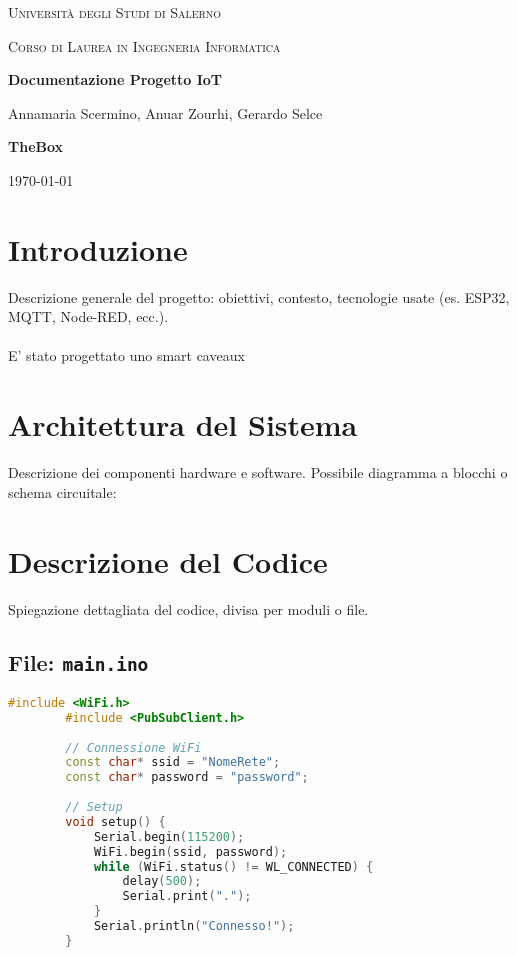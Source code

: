 \documentclass[12pt,a4paper]{article}
\begin{document}
	
	\begin{titlepage}
		\centering
		{\scshape\LARGE Università degli Studi di Salerno \par}
		\vspace{1cm}
		{\scshape\Large Corso di Laurea in Ingegneria Informatica\par}
		\vspace{2cm}
		{\huge\bfseries Documentazione Progetto IoT\par}
		\vspace{1.5cm}
		{\Large Annamaria Scermino, Anuar Zourhi, Gerardo Selce \par}
		\vspace{1.5cm}
		{\huge\bfseries TheBox\par}
		\vfill
		{\large \today\par}
	\end{titlepage}
	
	\tableofcontents
	\newpage
	
	\section{Introduzione}
	Descrizione generale del progetto: obiettivi, contesto, tecnologie usate (es. ESP32, MQTT, Node-RED, ecc.).\\ \\
	
	E' stato progettato uno smart caveaux
	
	\section{Architettura del Sistema}
	Descrizione dei componenti hardware e software. Possibile diagramma a blocchi o schema circuitale:
	
	
	\section{Descrizione del Codice}
	Spiegazione dettagliata del codice, divisa per moduli o file.
	
	\subsection{File: \texttt{main.ino}}
	\begin{lstlisting}[language=C++, caption={File principale per ESP32}]
		#include <WiFi.h>
		#include <PubSubClient.h>
		
		// Connessione WiFi
		const char* ssid = "NomeRete";
		const char* password = "password";
		
		// Setup
		void setup() {
			Serial.begin(115200);
			WiFi.begin(ssid, password);
			while (WiFi.status() != WL_CONNECTED) {
				delay(500);
				Serial.print(".");
			}
			Serial.println("Connesso!");
		}
	\end{lstlisting}
	
\end{document}
